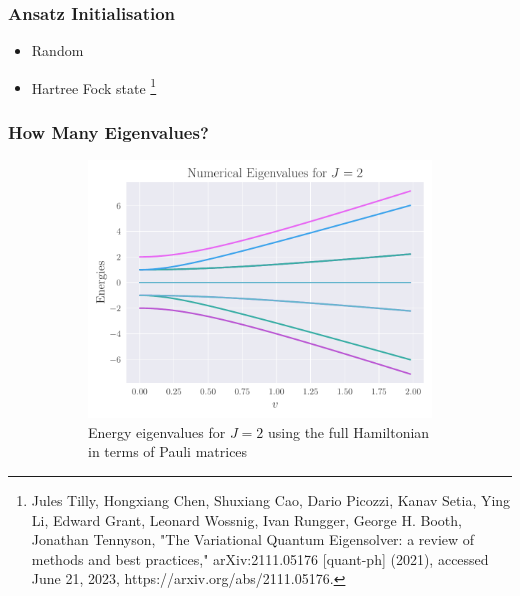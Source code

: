 \documentclass{beamer}
\begin{document}
\begin{frame}[t]
	\frametitle{Ansatz Initialisation}
		\begin{itemize}
			\item Random
			\item Hartree Fock state \footnote{Jules Tilly, Hongxiang Chen, Shuxiang Cao, Dario Picozzi, Kanav Setia, Ying Li, Edward Grant, Leonard Wossnig, Ivan Rungger, George H. Booth, Jonathan Tennyson, "The Variational Quantum Eigensolver: a review of methods and best practices," arXiv:2111.05176 [quant-ph] (2021), accessed June 21, 2023, https://arxiv.org/abs/2111.05176.}
		\end{itemize}
\end{frame}
\begin{frame}[t]
	\frametitle{How Many Eigenvalues?}
	\begin{figure}[ht]
		\centering
		\begin{subfigure}[b]{0.45\textwidth}
		\begin{center}
			\includegraphics[width=\textwidth]{../src/plots/lipkin-eigs-4.pdf}
		\end{center}
		\caption{Energy eigenvalues for $ J=2 $ using the full Hamiltonian in terms of Pauli matrices}
		\label{fig:eig-lipkin-2}
		\end{subfigure}
		\hfill
		\begin{subfigure}[b]{0.45\textwidth}
		\begin{center}

\end{center}
\end{subfigure}
\end{figure}
\end{frame}
\end{document}
